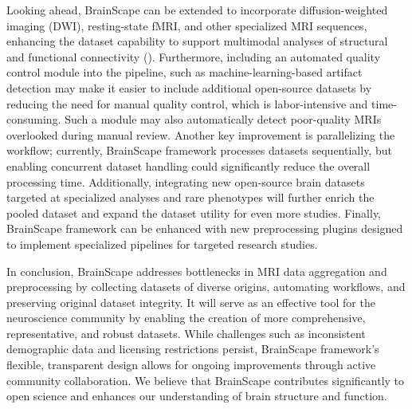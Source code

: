 Looking ahead, BrainScape can be extended to incorporate diffusion-weighted imaging (DWI), resting-state fMRI, 
and other specialized MRI sequences, enhancing the dataset capability to support multimodal analyses 
of structural and functional connectivity (\cite{van2013wu}). 
Furthermore, including an automated quality control module into the pipeline, such as machine-learning-based artifact detection 
may make it easier to include additional open-source datasets by reducing the need for manual quality control, which is labor-intensive and time-consuming. 
Such a module may also automatically detect poor-quality MRIs overlooked during manual review. 
Another key improvement is parallelizing the workflow; currently, BrainScape framework processes datasets sequentially, 
but enabling concurrent dataset handling could significantly reduce the overall processing time. 
Additionally, integrating new open-source brain datasets targeted at specialized analyses and rare phenotypes will further enrich the pooled dataset 
and expand the dataset utility for even more studies. 
Finally, BrainScape framework can be enhanced with new preprocessing plugins designed to implement specialized pipelines for targeted research studies.

In conclusion, BrainScape addresses bottlenecks in MRI data aggregation and preprocessing by 
collecting datasets of diverse origins, automating workflows, and preserving original dataset integrity. 
It will serve as an effective tool for the neuroscience community by enabling the creation of more comprehensive, representative, and robust datasets.
While challenges such as inconsistent demographic data and licensing restrictions persist, 
BrainScape framework's flexible, transparent design allows for ongoing improvements through active community collaboration.
We believe that BrainScape contributes significantly to open science and enhances our understanding of brain structure and function.